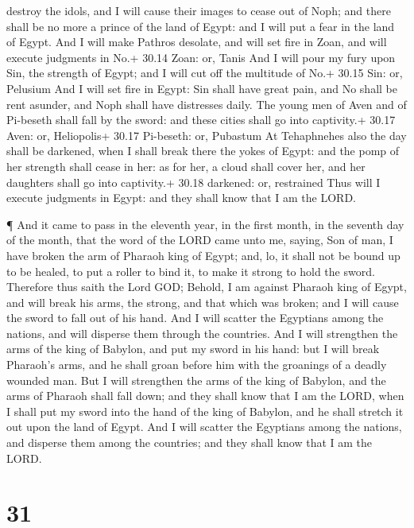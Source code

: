 destroy the idols, and I will cause their images to cease out of Noph;
and there shall be no more a prince of the land of Egypt: and I will put
a fear in the land of Egypt.  And I will make Pathros
desolate, and will set fire in Zoan, and will execute judgments in No.+
30.14 Zoan: or, Tanis  And I will pour my fury upon Sin,
the strength of Egypt; and I will cut off the multitude of No.+ 30.15
Sin: or, Pelusium  And I will set fire in Egypt: Sin shall
have great pain, and No shall be rent asunder, and Noph shall have
distresses daily.  The young men of Aven and of Pi-beseth
shall fall by the sword: and these cities shall go into captivity.+
30.17 Aven: or, Heliopolis+ 30.17 Pi-beseth: or, Pubastum 
At Tehaphnehes also the day shall be darkened, when I shall break there
the yokes of Egypt: and the pomp of her strength shall cease in her: as
for her, a cloud shall cover her, and her daughters shall go into
captivity.+ 30.18 darkened: or, restrained  Thus will I
execute judgments in Egypt: and they shall know that I am the LORD.

 ¶ And it came to pass in the eleventh year, in the first
month, in the seventh day of the month, that the word of the LORD came
unto me, saying,  Son of man, I have broken the arm of
Pharaoh king of Egypt; and, lo, it shall not be bound up to be healed,
to put a roller to bind it, to make it strong to hold the sword.
 Therefore thus saith the Lord GOD; Behold, I am against
Pharaoh king of Egypt, and will break his arms, the strong, and that
which was broken; and I will cause the sword to fall out of his hand.
 And I will scatter the Egyptians among the nations, and
will disperse them through the countries.  And I will
strengthen the arms of the king of Babylon, and put my sword in his
hand: but I will break Pharaoh's arms, and he shall groan before him
with the groanings of a deadly wounded man.  But I will
strengthen the arms of the king of Babylon, and the arms of Pharaoh
shall fall down; and they shall know that I am the LORD, when I shall
put my sword into the hand of the king of Babylon, and he shall stretch
it out upon the land of Egypt.  And I will scatter the
Egyptians among the nations, and disperse them among the countries; and
they shall know that I am the LORD.

\hypertarget{section-30}{%
\section{31}\label{section-30}}

